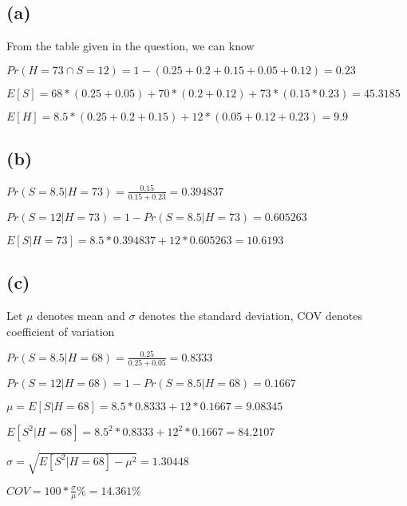 \documentclass[12pt]{article}
\begin{document}
\begin{spacing}{2.0}
\subsection*{(a)}

From the table given in the question, we can know

$Pr(H=73 \cap S=12)= 1-(0.25+0.2+0.15+0.05+0.12)= 0.23$

$E[S]= 68*(0.25+0.05)+70*(0.2+0.12)+ 73*(0.15*0.23)= 45.3185$

$E[H]= 8.5*(0.25+0.2+0.15)+ 12*(0.05+0.12+0.23)= 9.9$

\subsection*{(b)}

$Pr(S=8.5|H=73)= \frac{0.15}{0.15+0.23} = 0.394837$

$Pr(S=12|H=73)= 1- Pr(S=8.5|H=73) = 0.605263$

$E[S|H=73]= 8.5*0.394837 + 12*0.605263= 10.6193$

\subsection*{(c)}
Let $\mu$ denotes mean and $\sigma$ denotes the standard deviation, COV denotes coefficient of variation

$Pr(S=8.5|H=68)= \frac{0.25}{0.25+0.05}= 0.8333$

$Pr(S=12|H=68)= 1- Pr(S=8.5|H=68)= 0.1667$

$\mu=E[S|H=68]= 8.5*0.8333+12*0.1667 = 9.08345$

$E[S^2|H=68]= 8.5^2*0.8333+12^2*0.1667=84.2107$

$\sigma=\sqrt{E[S^2|H=68]- \mu^2}= 1.30448$

$COV=100*\frac{\sigma}{\mu} \%=  14.361 \%$


\end{spacing}
\end{document}
